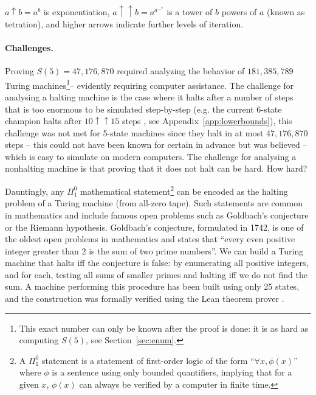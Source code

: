 \documentclass[a4paper,british]{article}
\theoremstyle{definition} %
\numberwithin{equation}{section}
\theoremstyle{definition} %
\newcommand{\BBtheFifth}{47{,}176{,}870}
\newcommand{\BBtheFifthTNF}{181{,}385{,}789}
\begin{document}
\begin{table}[h]
{        $a \uparrow b = a^b$ is exponentiation,
        $a \uparrow\uparrow b = a^{a^{\dots^a}}$ is a tower of $b$ powers of $a$ (known as tetration),
        and higher arrows indicate further levels of iteration.
    }
    \label{table:landscape}
\end{table}











\paragraph{Challenges.} Proving $S(5) = \BBtheFifth$ required analyzing the behavior of $\BBtheFifthTNF$ Turing machines\footnote{This exact number can only be known after the proof is done: it is as hard as computing $S(5)$, see Section~\ref{sec:enum}.}-- evidently requiring computer assistance. The challenge for analysing a halting machine is the case where it halts after a number of steps that is too enormous to be simulated step-by-step (e.g. the current 6-state champion halts after $10 \uparrow \uparrow 15$ steps \cite{Pavel_discorvery}, see Appendix~\ref{app:lowerbounds}), this challenge was not met for 5-state machines since they halt in at most $\BBtheFifth$ steps -- this could not have been known for certain in advance but was believed -- which is easy to simulate on modern computers. The challenge for analysing a nonhalting machine is that proving that it does not halt can be hard. How hard?

Dauntingly, any $\Pi_1^0$ mathematical statement\footnote{A $\Pi_1^0$ statement is a statement of first-order logic of the form ``$\forall x, \phi(x)$'' where $\phi$ is a sentence using only bounded quantifiers, implying that for a given $x$, $\phi(x)$ can always be verified by a computer in finite time.} can be encoded as the halting problem of a Turing machine (from all-zero tape). Such statements are common in mathematics and include famous open problems such as Goldbach's conjecture or the Riemann hypothesis. Goldbach's conjecture, formulated in 1742, is one of the oldest open problems in mathematics and states that ``every even positive integer greater than 2 is the sum of two prime numbers''. We can build a Turing machine that halts iff the conjecture is false: by enumerating all positive integers, and for each, testing all sums of smaller primes and halting iff we do not find the sum. A machine performing this procedure has been built using only 25 states, and the construction was formally verified using the Lean theorem prover \cite{GoldbachTM27, GoldbachTM25, DeMouraKongAvigadVanDoornvonRaumer}.
\end{document}
